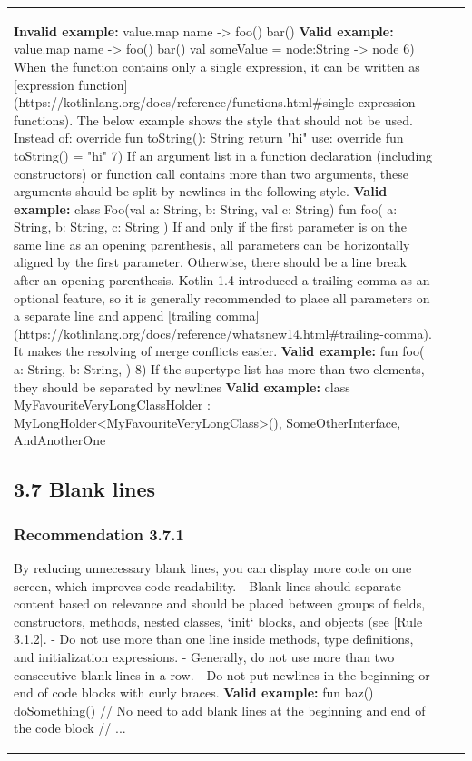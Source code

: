 \begin{center}
\begin{tabular}{ |p{}|p{}|p{}| }
{{\textbf{Invalid example:}
    value.map { name -> foo()
        bar()
    }
\textbf{Valid example:}
value.map { name ->
    foo()
    bar()
}
val someValue = { node:String -> node }
6) When the function contains only a single expression, it can be written as [expression function](https://kotlinlang.org/docs/reference/functions.html\#single-expression-functions).
   The below example shows the style that should not be used.
Instead of:
override fun toString(): String { return "hi" }
use:
override fun toString() = "hi"
7)  If an argument list in a function declaration (including constructors) or function call contains more than two arguments, these arguments should be split by newlines in the following style.
\textbf{Valid example:}
class Foo(val a: String,
          b: String,
          val c: String) {
}
fun foo(
        a: String,
        b: String,
        c: String
) {
}
If and only if the first parameter is on the same line as an opening parenthesis, all parameters can be horizontally aligned by the first parameter.
Otherwise, there should be a line break after an opening parenthesis.
Kotlin 1.4 introduced a trailing comma as an optional feature, so it is generally recommended to place all parameters on a separate line
and append [trailing comma](https://kotlinlang.org/docs/reference/whatsnew14.html\#trailing-comma).
It makes the resolving of merge conflicts easier.
\textbf{Valid example:}
fun foo(
        a: String,
        b: String,
) {
}
8) If the supertype list has more than two elements, they should be separated by newlines
\textbf{Valid example:}
class MyFavouriteVeryLongClassHolder :
    MyLongHolder<MyFavouriteVeryLongClass>(),
    SomeOtherInterface,
    AndAnotherOne { }
\subsection*{\textbf{3.7 Blank lines}}
\subsubsection*{\textbf{Recommendation 3.7.1}}
By reducing unnecessary blank lines, you can display more code on one screen, which improves code readability.
- Blank lines should separate content based on relevance and should be placed between groups of fields, constructors, methods, nested classes, `init` blocks, and objects (see [Rule 3.1.2].
- Do not use more than one line inside methods, type definitions, and initialization expressions.
- Generally, do not use more than two consecutive blank lines in a row.
- Do not put newlines in the beginning or end of code blocks with curly braces.
\textbf{Valid example:}
fun baz() {
    doSomething()  // No need to add blank lines at the beginning and end of the code block
    // ...
}
}}
\end{tabular}
\end{center}
